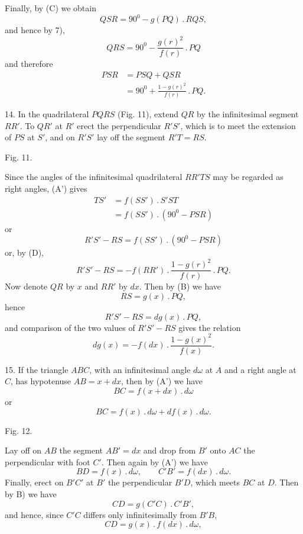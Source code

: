 %
\noindent Finally, by (C) we obtain
\[
QSR = 90^{0} - g(PQ) \,.\, RQS,
\]
and hence by 7),
\[
QRS = 90^{0} - \frac{g(r)^2}{f(r)} \,.\, PQ
\]
and therefore
\[
\tag*{(D)} \begin{aligned}PSR &= PSQ + QSR\\ &= 90^{0} + \frac{1 - g(r)^2}{f(r)} \,.\, PQ.\end{aligned}
\]

14. In the quadrilateral $PQRS$ (Fig. 11), extend $QR$ by the infinitesimal
segment $RR'$. To $QR'$ at $R'$ erect the perpendicular $R'S'$, which is to meet the extension of
$PS$ at $S'$, and on $R'S'$ lay off the segment $R'T = RS$.

\begin{center}\begin{minipage}{\linewidth}\centering


Fig. 11.
\end{minipage}\end{center}

Since the angles of the infinitesimal quadrilateral $RR'TS$ may be regarded as
right angles, (A') gives
\[
\begin{aligned}TS' &= f(SS') \,.\, S'ST\\ &= f(SS') \,.\, (90^{0} - PSR)\end{aligned}
\]
or
\[
R'S' - RS = f(SS') \,.\, (90^{0} - PSR)
\]
or, by (D),
\[
\tag*{8)} R'S' - RS = -f(RR') \,.\, \frac{1 - g(r)^2}{f(r)} \,.\, PQ.
\]
Now denote $QR$ by $x$ and $RR'$ by $dx$. Then by (B) we have
\[
RS = g(x) \,.\, PQ,
\]
hence
\[
\tag*{9)} R'S' - RS = dg(x) \,.\, PQ,
\]
and comparison of the two values of $R'S' - RS$ gives the relation
\[
\tag*{(E)} dg(x) = -f(dx) \,.\, \frac{1 - g(x)^2}{f(x)}.
\]

15. If the triangle $ABC$, with an infinitesimal angle $d\omega$ at $A$
and a right angle at $C$, has hypotenuse $AB = x + dx$, then by (A') we have
\[
BC = f(x + dx) \,.\, d\omega
\]
or
\[
\tag*{10)} BC = f(x) \,.\, d\omega + df(x) \,.\, d\omega.
\]
\begin{center}\begin{minipage}{\linewidth}\centering


Fig. 12.
\end{minipage}\end{center}

Lay off on $AB$ the segment $AB' = dx$ and drop from $B'$ onto $AC$ the perpendicular
with foot $C'$. Then again by (A') we have
\[
BD = f(x) \,.\, d\omega, \qquad C'B' = f(dx) \,.\, d\omega.
\]
Finally, erect on $B'C'$ at $B'$ the perpendicular $B'D$, which meets $BC$ at $D$.
Then by B) we have
\[
CD = g(C'C) \,.\, C'B',
\]
and hence, since $C'C$ differs only infinitesimally from $B'B$,
\[
\tag*{11)} CD = g(x) \,.\, f(dx) \,.\, d\omega,
\]

